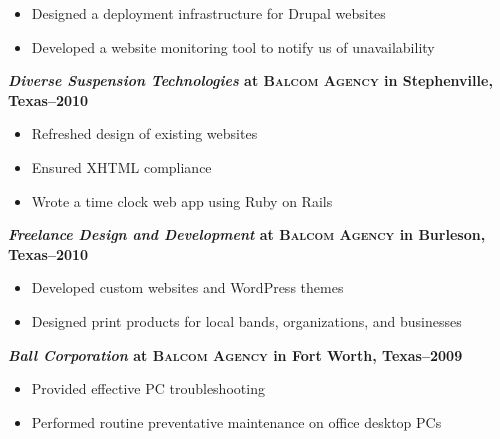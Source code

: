 \documentclass[margin]{res}
\begin{document}
\begin{resume}
\begin{itemize}
                   \item Designed a deployment infrastructure for Drupal websites
                 
                   \item Developed a website monitoring tool to notify us of unavailability
                 \end{itemize}
              
                \textbf{\textit{Diverse Suspension Technologies}
                 at \textsc{Balcom Agency} in Stephenville, Texas--2010}
                 \vspace{-10pt}\begin{itemize} \itemsep -2pt %
                   \item Refreshed design of existing websites
                 
                   \item Ensured XHTML compliance
                 
                   \item Wrote a time clock web app using Ruby on Rails
                 \end{itemize}
              
                \textbf{\textit{Freelance Design and Development}
                 at \textsc{Balcom Agency} in Burleson, Texas--2010}
                 \vspace{-10pt}\begin{itemize} \itemsep -2pt %
                   \item Developed custom websites and WordPress themes
                 
                   \item Designed print products for local bands, organizations, and businesses
                 \end{itemize}
              
                \textbf{\textit{Ball Corporation}
                 at \textsc{Balcom Agency} in Fort Worth, Texas--2009}
                 \vspace{-10pt}\begin{itemize} \itemsep -2pt %
                   \item Provided effective PC troubleshooting
                 
                   \item Performed routine preventative maintenance on office desktop PCs
                 \end{itemize}
              


\end{resume}
\end{document}

